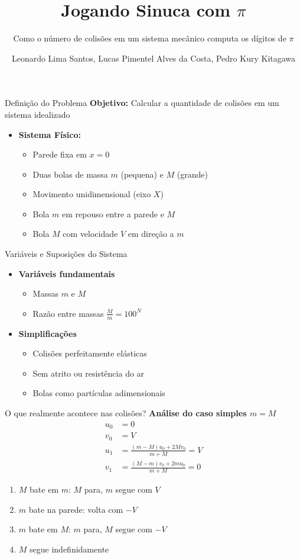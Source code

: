 \documentclass{beamer}
\title{Jogando Sinuca com $\pi$}
\subtitle{Como o número de colisões em um sistema mecânico computa os dígitos de $\pi$}
\author{Leonardo Lima Santos, Lucas Pimentel Alves da Costa, Pedro Kury Kitagawa}
\date{}
\begin{document}
\begin{frame}
  \titlepage
\end{frame}

\begin{frame}{Definição do Problema}
\textbf{Objetivo:} Calcular a quantidade de colisões em um sistema idealizado
\begin{itemize}
  \item \textbf{Sistema Físico:}
  \begin{itemize}
    \item Parede fixa em $x = 0$
    \item Duas bolas de massa $m$ (pequena) e $M$ (grande)
    \item Movimento unidimensional (eixo $X$)
    \item Bola $m$ em repouso entre a parede e $M$
    \item Bola $M$ com velocidade $V$ em direção a $m$
  \end{itemize}
\end{itemize}
\end{frame}

\begin{frame}{Variáveis e Suposições do Sistema}
\begin{itemize}
  \item \textbf{Variáveis fundamentais}
    \begin{itemize}
      \item Massas $m$ e $M$
      \item Razão entre massas $\frac{M}{m} = 100^N$
    \end{itemize}
  \item \textbf{Simplificações}
    \begin{itemize}
      \item Colisões perfeitamente elásticas
      \item Sem atrito ou resistência do ar
      \item Bolas como partículas adimensionais
    \end{itemize}
\end{itemize}
\end{frame}

\begin{frame}{O que realmente acontece nas colisões?}
\textbf{Análise do caso simples $m = M$}
\[
\begin{aligned}
u_0 & = 0 \\
v_0 & = V \\
u_1 & = \frac{(m - M)u_0 + 2Mv_0}{m + M} = V \\
v_1 & = \frac{(M - m)v_0 + 2mu_0}{m + M} = 0
\end{aligned}
\]
\begin{enumerate}
  \item $M$ bate em $m$: $M$ para, $m$ segue com $V$
  \item $m$ bate na parede: volta com $-V$
  \item $m$ bate em $M$: $m$ para, $M$ segue com $-V$
  \item $M$ segue indefinidamente
\end{enumerate}
\end{frame}
\end{document}
